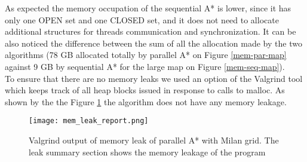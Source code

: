 As expected the memory occupation of the sequential A* is lower, since it has only one OPEN set and one CLOSED set, and it does not need to allocate additional structures for threads communication and synchronization.
It can be also noticed the difference between the sum of all the allocation made by the two algorithms (78 GB allocated totally by parallel A* on Figure \ref{mem-par-map} against 9 GB by sequential A* for the large map on Figure \ref{mem-seq-map}).
\\
To ensure that there are no memory leaks we used an option of the Valgrind tool which keeps track of all heap blocks issued in response to calls to malloc.
As shown by the the Figure \ref{mem-leak-milan} the algorithm does not have any memory leakage.

\begin{figure}[h]
    \centering
    \texttt{[image: mem\_leak\_report.png]}
    \caption{Valgrind output of memory leak of parallel A* with Milan grid. The leak summary section shows the memory leakage of the program}
    \label{mem-leak-milan}
\end{figure}



